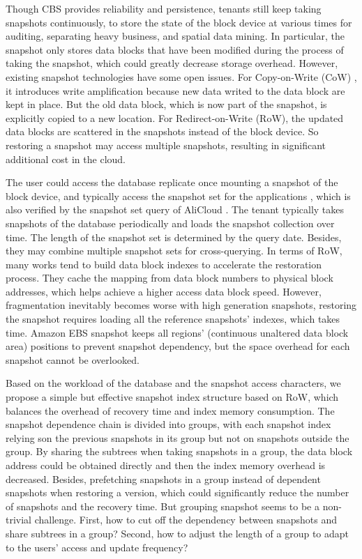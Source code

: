 \documentclass[sigconf, nonacm]{acmart}
\begin{document}
Though CBS provides reliability and persistence, tenants still keep taking snapshots continuously, to store the state of the block device at various times for auditing, separating heavy business, and spatial data mining. In particular, the snapshot only stores data blocks that have been modified during the process of taking the snapshot, which could greatly decrease storage overhead. However, existing snapshot technologies have some open issues. For Copy-on-Write (CoW) \cite{nightingale2008rethink,chidambaram2013optimistic}, it introduces write amplification because new data writed to the data block are kept in place. But the old data block, which is now part of the snapshot, is explicitly copied to a new location. For Redirect-on-Write (RoW), the updated data blocks are scattered in the snapshots instead of the block device. So restoring a snapshot may access multiple snapshots, resulting in significant additional cost in the cloud.

The user could access the database replicate once mounting a snapshot of the block device, and typically access the snapshot set for the applications \cite{yang2011st,joseph2019securing,pekerskaya2006mining}, which is also verified by the snapshot set query of AliCloud \cite{alibackupset}. The tenant typically takes snapshots of the database periodically and loads the snapshot collection over time. The length of the snapshot set is determined by the query date. Besides, they may combine multiple snapshot sets for cross-querying.
In terms of RoW, many works tend to build data block indexes \cite{tsikoudis2020rid,tsikoudis2018rql,shrira2005snap} to accelerate the restoration process. They cache the mapping from data block numbers to physical block addresses, which helps achieve a higher access data block speed. However, fragmentation inevitably becomes worse with high generation snapshots, restoring the snapshot requires loading all the reference snapshots' indexes, which takes time. Amazon EBS snapshot \cite{AmazonEBSSnapshot} keeps all regions' (continuous unaltered data block area) positions to prevent snapshot dependency, but the space overhead for each snapshot cannot be overlooked.

Based on the workload of the database and the snapshot access characters, we propose a simple but effective snapshot index structure based on RoW, which balances the overhead of recovery time and index memory consumption. The snapshot dependence chain is divided into groups, with each snapshot index relying son the previous snapshots in its group but not on snapshots outside the group. 
By sharing the subtrees when taking snapshots in a group, the data block address could be obtained directly and then the index memory overhead is decreased. Besides, prefetching snapshots in a group instead of dependent snapshots when restoring a version, which could significantly reduce the number of snapshots and the recovery time. But grouping snapshot seems to be a non-trivial challenge. First, how to cut off the dependency between snapshots and share subtrees in a group? Second, how to adjust the length of a group to adapt to the users' access and update frequency?
\end{document}
